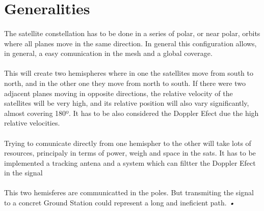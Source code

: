 \section{Generalities}
\paragraph{}
The satellite constellation has to be done in a series of
polar, or near polar, orbits where all planes move in the same direction. In general this configuration allows, in general, a easy comunication in the mesh and a global coverage.
\paragraph{} 
This will create two hemispheres where in one the satellites move from south to north, and in the other one they move from north to south. If there were two adjacent planes moving in opposite directions, the relative velocity of the satellites will be very high, and its relative position will also vary significantly, almost covering 180º. It has to be  also considered the Doppler Efect due the high relative velocities. 
\paragraph{}
Trying to comunicate directly from one hemispher to the other will take lots of resources, principaly in terms of power, weigh and space in the sats. It has to be implemented a tracking antena and a system which can filtter the Doppler Efect in the signal
\paragraph{}
This two hemisferes are communicatted in the poles. But transmiting the signal to a concret Ground Station could represent a long and ineficient path.
\emph{•}




